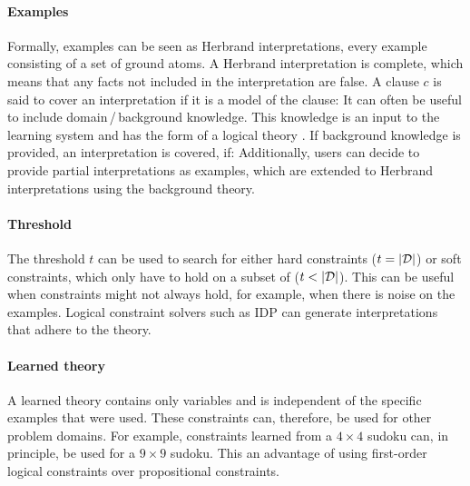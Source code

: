 \paragraph{Examples}
Formally, examples can be seen as Herbrand interpretations, every example consisting of a set of ground atoms.
A Herbrand interpretation is complete, which means that any facts not included in the interpretation are false.
A clause $c$ is said to cover an interpretation  if it is a model of the clause: 
It can often be useful to include domain\,/\,background knowledge.
This knowledge is an input to the learning system and has the form of a logical theory .
If background knowledge is provided, an interpretation  is covered, if: 
Additionally, users can decide to provide partial interpretations as examples, which are extended to Herbrand interpretations using the background theory.

\paragraph{Threshold}
The threshold $t$ can be used to search for either hard constraints ($t = |\mathcal{D}|$) or soft constraints, which only have to hold on a subset of  ($t < |\mathcal{D}|$).
This can be useful when constraints might not always hold, for example, when there is noise on the examples.
Logical constraint solvers such as IDP can generate interpretations that adhere to the theory.

\paragraph{Learned theory}
A learned theory  contains only variables and is independent of the specific examples that were used.
These constraints can, therefore, be used for other problem domains.
For example, constraints learned from a $4 \times 4$ sudoku can, in principle, be used for a $9 \times 9$ sudoku.
This an advantage of using first-order logical constraints over propositional constraints.


